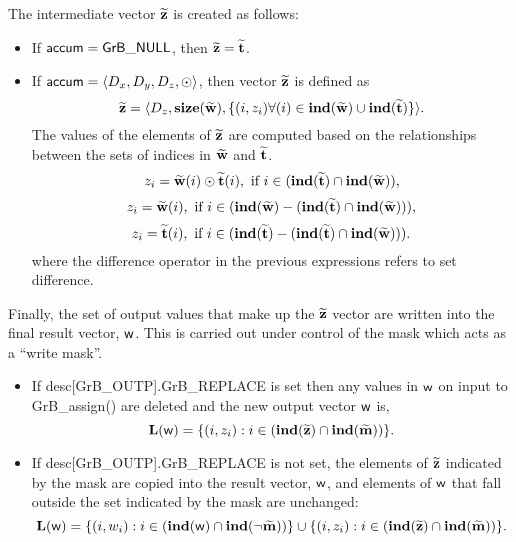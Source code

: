 The intermediate vector ${\bf \widetilde{z}}$ is created as follows:
\begin{itemize}
    \item If ${\sf accum} = {\sf GrB\_NULL}$, then 
    ${\bf \widetilde{z}} = {\bf \widetilde{t}}$.

    \item If ${\sf accum} = \langle D_x, D_y, D_z, \odot \rangle$, then vector 
    ${\bf \widetilde{z}}$ is defined as 
        \[ 
        {\bf \widetilde{z}} =
        \langle D_z, \bold{size}({\bf \widetilde{w}}), 
		\{(i,z_{i})  \forall (i) \in \bold{ind}({\bf \widetilde{w}}) \cup 
        \bold{ind}({\bf \widetilde{t}}) \} \rangle.\]
    The values of the elements of ${\bf \widetilde{z}}$ are computed based 
    on the relationships between the sets of indices in ${\bf \widetilde{w}}$ 
    and ${\bf \widetilde{t}}$.
\[
    z_{i} = {\bf \widetilde{w}}(i) \odot {\bf \widetilde{t}}(i), \ \mbox{if}\  
    i \in  (\bold{ind}({\bf \widetilde{t}}) \cap \bold{ind}({\bf \widetilde{w}})),
\]
\[
    z_{i} = {\bf \widetilde{w}}(i), \ \mbox{if}\  
    i \in  (\bold{ind}({\bf \widetilde{w}}) - (\bold{ind}({\bf \widetilde{t}})
    \cap \bold{ind}({\bf \widetilde{w}}))),
\]
\[
    z_{i} = {\bf \widetilde{t}}(i), \ \mbox{if}\  i \in  
    (\bold{ind}({\bf \widetilde{t}}) - (\bold{ind}({\bf \widetilde{t}}) 
    \cap \bold{ind}({\bf \widetilde{w}}))).
\]
where the difference operator in the previous expressions refers to set difference.
\end{itemize}

Finally, the set of output values that make up the ${\bf \widetilde{z}}$ 
vector are written into the final result vector, ${\sf w}$. 
This is carried out under control of the mask which acts as a ``write mask''.
\begin{itemize}
\item If {\sf desc[GrB\_OUTP].GrB\_REPLACE} is set then any values in ${\sf w}$ 
on input to {\sf GrB\_assign()} are deleted and the new output vector ${\sf w}$ is,
\[ \bold{L}({\sf w}) = \{(i,z_{i}) : i \in (\bold{ind}({\bf \widetilde{z}}) 
\cap \bold{ind}({\bf \widetilde{m}})) \}. \]

\item If {\sf desc[GrB\_OUTP].GrB\_REPLACE} is not set, the elements of 
${\bf \widetilde{z}}$ indicated by 
the mask are copied into the result vector, ${\sf w}$, and elements of 
${\sf w}$ that fall outside the set indicated by the mask are unchanged:
\[ \bold{L}({\sf w}) = \{(i,w_{i}) : i \in (\bold{ind}({\bf \sf w}) 
\cap \bold{ind}(\neg {\bf \widetilde{m}})) \} \cup \{(i,z_{i}) : i \in 
(\bold{ind}({\bf \widetilde{z}}) \cap \bold{ind}({\bf \widetilde{m}})) \}. \]
\end{itemize}

